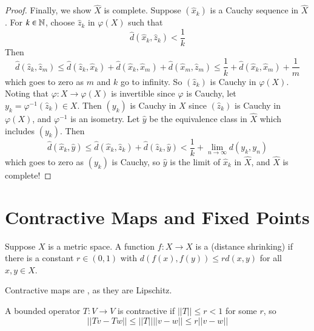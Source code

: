 \begin{proof}
    Finally, we show $\hat{X}$ is complete. Suppose $(\hat{x}_k)$ is a Cauchy sequence in $\hat{X}$. For $k \in \mathbb N$, choose $\hat{z}_k$ in $\varphi(X)$ such that $$\hat{d}(\hat{x}_k,\hat{z}_k) < \frac{1}{k}$$ Then $$\hat{d}(\hat{z}_k,\hat{z}_m) \leq \hat{d}(\hat{z}_k,\hat{x}_k)+\hat{d}(\hat{x}_k,\hat{x}_m)+\hat{d}(\hat{x}_m,\hat{z}_m) \leq \frac{1}{k} + \hat{d}(\hat{x}_k,\hat{x}_m) + \frac{1}{m}$$ which goes to zero as $m$ and $k$ go to infinity. So $(\hat{z}_k)$ is Cauchy in $\varphi(X)$. Noting that $\varphi:X\rightarrow \varphi(X)$ is invertible since $\varphi$ is Cauchy, let $y_k = \varphi^{-1}(\hat{z}_k) \in X$. Then $(y_k)$ is Cauchy in $X$ since $(\hat{z}_k)$ is Cauchy in $\varphi(X)$, and $\varphi^{-1}$ is an isometry. Let $\hat{y}$ be the equivalence class in $\hat{X}$ which includes $(y_k)$. Then $$\hat{d}(\hat{x}_k,\hat{y}) \leq \hat{d}(\hat{x}_k,\hat{z}_k) + \hat{d}(\hat{z}_k,\hat{y}) < \frac{1}{k} + \lim\limits_{n\rightarrow \infty}d(y_k,y_n)$$ which goes to zero as $(y_k)$ is Cauchy, so $\hat{y}$ is the limit of $\hat{x}_k$ in $\hat{X}$, and $\hat{X}$ is complete!
\end{proof}

\section{Contractive Maps and Fixed Points}

\begin{definition}
    Suppose $X$ is a metric space. A function $f:X\rightarrow X$ is a  (distance shrinking) if there is a constant $r \in (0,1)$ with $d(f(x),f(y)) \leq rd(x,y)$ for all $x,y \in X$.
\end{definition}

Contractive maps are , as they are Lipschitz.

\begin{example}
    A bounded operator $T:V\rightarrow V$ is contractive if $||T|| \leq r < 1$ for some $r$, so $$||Tv-Tw|| \leq ||T||||v-w|| \leq r||v-w||$$
\end{example}

